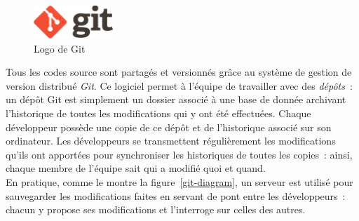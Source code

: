 \paragraph{}
\begin{figure}
  \centering
  \includegraphics[width=3cm]{images/git-logo.png}
  \caption{Logo de Git}
\end{figure}
Tous les codes source sont partagés et versionnés grâce au système de gestion de version 
distribué \emph{Git}\cite{gestion-versions}. Ce logiciel permet à l'équipe de travailler
avec des \emph{dépôts}~: un dépôt Git est simplement un dossier associé à une base
de donnée archivant l'historique de toutes les modifications qui y ont été effectuées. Chaque développeur
possède une copie de ce dépôt et de l'historique associé sur son ordinateur. Les développeurs se
transmettent régulièrement les modifications qu'ils ont apportées pour synchroniser
les historiques de toutes les copies~: ainsi, chaque membre de l'équipe sait qui a modifié quoi et quand.\\
En pratique, comme le montre la figure~\ref{git-diagram}, un serveur est utilisé pour sauvegarder les modifications faites en
servant de pont entre les développeurs~: chacun y propose ses modifications et l'interroge
sur celles des autres.
